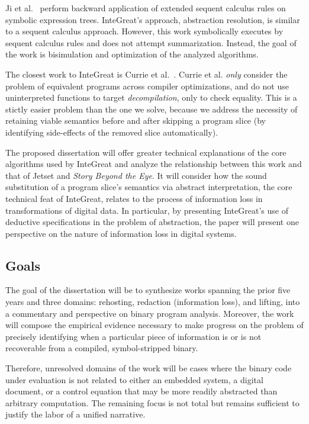 Ji et al.~\cite{transformation} perform backward application of extended sequent calculus rules on symbolic expression trees.
InteGreat's approach, abstraction resolution, is similar to a sequent calculus approach.
However, this work symbolically executes by sequent calculus rules and does not attempt summarization. 
Instead, the goal of the work is bisimulation and optimization of the analyzed algorithms.

The closest work to InteGreat is Currie et al.~\cite{currie2006embedded}. 
Currie et al. \emph{only} consider the problem of equivalent programs across compiler optimizations, and do not use uninterpreted functions to target \emph{decompilation}, only to check equality.
This is a stictly easier problem than the one we solve, because we address the necessity of retaining viable semantics before and after skipping a program slice (by identifying side-effects of the removed slice automatically).

The proposed dissertation will offer greater technical explanations of the core algorithms used by InteGreat and analyze the relationship between this work and that of Jetset and \emph{Story Beyond the Eye}.
It will consider how the sound substitution of a program slice's semantics via abstract interpretation, the core technical feat of InteGreat, relates to the process of information loss in transformations of digital data.
In particular, by presenting InteGreat's use of deductive specifications in the problem of abstraction, the paper will present one perspective on the nature of information loss in digital systems.

\subsection{Goals}

The goal of the dissertation will be to synthesize works spanning the prior five years and three domains: rehosting, redaction (information loss), and lifting, into a commentary and perspective on binary program analysis.
Moreover, the work will compose the empirical evidence necessary to make progress on the problem of precisely identifying when a particular piece of information is or is not recoverable from a compiled, symbol-stripped binary.

Therefore, unresolved domains of the work will be cases where the binary code under evaluation is not related to either an embedded system, a digital document, or a control equation that may be more readily abstracted than arbitrary computation.
The remaining focus is not total but remains sufficient to justify the labor of a unified narrative.

